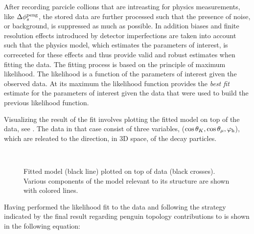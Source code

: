 After recording parcicle collions that are intreasting for physics measurements, like $\Delta\phi_{s}^{\tiny\text{peng}}$,
the stored data are further processed such that the presence of noise, or background, is suppressed as much
as possible. In addition biases and finite resolution effects introduced by detector imperfections are
taken into account such that the physics model, which estimates the parameters of interest, is
correceted for these effects and thus provide valid and robust estimates when fitting the data.
The fitting process is based on the principle of maximum likelihood. The likelihood is a
function of the parameters of interest given the observed data. At its maximum the likelihood function
provides the {\it best fit} estimate for the parameters of interest given the data that were
used to build the previous likelihood function.

Visualizing the result of the fit involves plotting the fitted model on top of the data,
see . The data in that case consist of three variables,
($\cos\theta_{K}, \cos\theta_{\mu}, \varphi_{\rm h}$), which are releated to the direction, in 3D space,
of the \BsJpsiPhi decay particles.

\begin{figure}[!t]
  \begin{subfigure}{0.5\textwidth}
    \centering
    \scalebox{1.2}{}
  \end{subfigure}%
  \hfill
  \begin{subfigure}{0.5\textwidth}
    \centering
    \scalebox{1.2}{}
  \end{subfigure}\\
  \begin{subfigure}{\textwidth}
    \centering
    \scalebox{1.2}{}
  \end{subfigure}
  \caption{Fitted model (black line) plotted on top of \BsJpsiKst data (black crosses).
           Various components of the model relevant to its \CP structure are shown with colored lines.}
  \label{app_angular_plot_thetas}
\end{figure}

Having performed the likelihood fit to the data and
following the strategy indicated by \cite{Fleischer:1999zi,Faller:2008gt,DeBruyn:2014oga,DeBruyn-thesis}
the final result regarding penguin topology contributions to \phis is shown in the following equation:

